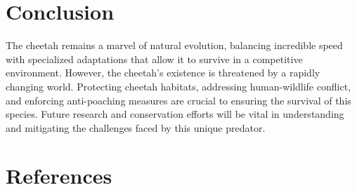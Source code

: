 \documentclass{article}
\begin{document}
\section{Conclusion}
The cheetah remains a marvel of natural evolution, balancing incredible speed with specialized adaptations that allow it to survive in a competitive environment. However, the cheetah's existence is threatened by a rapidly changing world. Protecting cheetah habitats, addressing human-wildlife conflict, and enforcing anti-poaching measures are crucial to ensuring the survival of this species. Future research and conservation efforts will be vital in understanding and mitigating the challenges faced by this unique predator.

\section{References}


\end{document}
